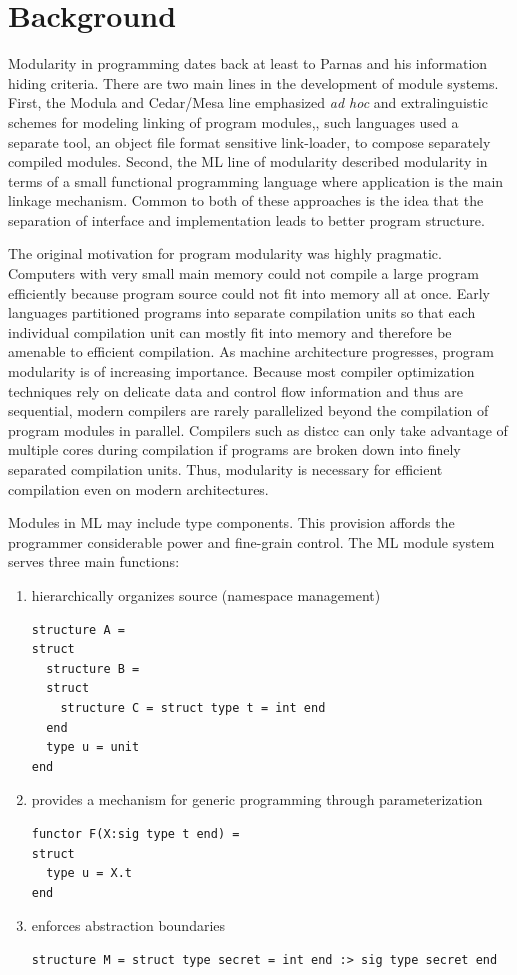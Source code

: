 \chapter{Background}\label{ch:background}

Modularity in programming dates back at least to Parnas and his
information hiding criteria\cite{parnas72}. There are two main lines
in the development of module systems. First, the Modula
\cite{wirth:module} and Cedar/Mesa \cite{cacm:mesa} line emphasized
{\it ad hoc} and extralinguistic schemes for modeling linking of
program modules,\ie, such languages used a separate tool, an object
file format sensitive link-loader, to compose separately compiled
modules.  Second, the ML line of modularity
\cite{macqueen:lfp84,macqueen:popl86,macqueen:lfp88} described
modularity in terms of a small functional programming language where
application is the main linkage mechanism. Common to both of these approaches is the idea that the separation of interface and implementation leads to better program structure. 

The original motivation for program modularity was highly pragmatic. Computers with very small main memory could not compile a large program efficiently because program source could not fit into memory all at once. Early languages partitioned programs into separate compilation units so that each individual compilation unit can mostly fit into memory and therefore be amenable to efficient compilation. As machine architecture progresses, program modularity is of increasing importance. Because most compiler optimization techniques rely on delicate data and control flow information and thus are sequential, modern compilers are rarely parallelized beyond the compilation of program modules in parallel. Compilers such as distcc can only take advantage of multiple cores during compilation if programs are broken down into finely separated compilation units. Thus, modularity is necessary for efficient compilation even on modern architectures. 


Modules in ML may include type components. This provision affords the programmer considerable power and fine-grain control. The ML module system serves three main functions:
\begin{enumerate}
	\item hierarchically organizes source (namespace management)
	\begin{lstlisting}
structure A =
struct
  structure B = 
  struct 
    structure C = struct type t = int end 
  end 
  type u = unit
end		
	\end{lstlisting}
	\item provides a mechanism for generic programming through parameterization
\begin{lstlisting}
functor F(X:sig type t end) =
struct
  type u = X.t 
end	
\end{lstlisting}
	\item enforces abstraction boundaries
\begin{lstlisting}
structure M = struct type secret = int end :> sig type secret end	
\end{lstlisting}
\end{enumerate} 

